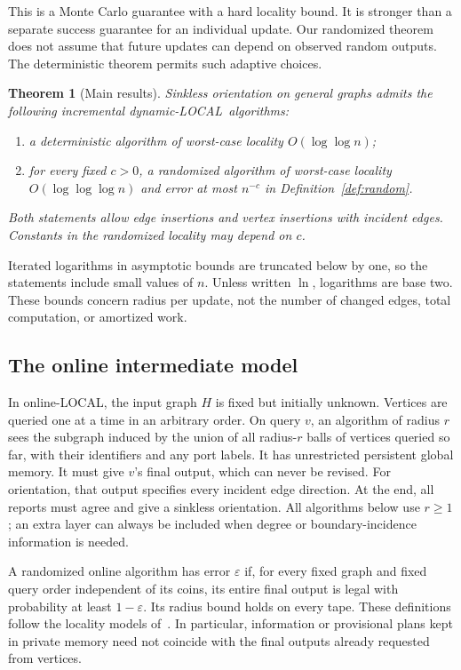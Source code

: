 \documentclass[11pt]{article}
\newtheorem{theorem}{Theorem}[section]
\theoremstyle{definition}
\newcommand{\Dyn}{\textnormal{dynamic-LOCAL}}
\newcommand{\On}{\textnormal{online-LOCAL}}
\begin{document}
This is a Monte Carlo guarantee with a hard locality bound. It is stronger
than a separate success guarantee for an individual update. Our randomized
theorem does not assume that future updates can depend on observed random
outputs. The deterministic theorem permits such adaptive choices.

\begin{theorem}[Main results]\label{thm:main}
Sinkless orientation on general graphs admits the following incremental
\Dyn\ algorithms:
\begin{enumerate}[label=(\roman*)]
\item a deterministic algorithm of worst-case locality $O(\log\log n)$;
\item for every fixed $c>0$, a randomized algorithm of worst-case locality
$O(\log\log\log n)$ and error at most $n^{-c}$ in
Definition~\ref{def:random}.
\end{enumerate}
Both statements allow edge insertions and vertex insertions with incident
edges. Constants in the randomized locality may depend on $c$.
\end{theorem}

Iterated logarithms in asymptotic bounds are truncated below by one, so the
statements include small values of $n$. Unless written $\ln$, logarithms are
base two. These bounds concern radius per update, not the number of changed
edges, total computation, or amortized work.

\subsection{The online intermediate model}

In \On, the input graph $H$ is fixed but initially unknown. Vertices are
queried one at a time in an arbitrary order. On query $v$, an algorithm of
radius $r$ sees the subgraph induced by the union of all radius-$r$ balls
of vertices queried so far, with their identifiers and any port labels. It
has unrestricted persistent global memory. It must give $v$'s final output,
which can never be revised. For orientation, that output specifies every
incident edge direction. At the end, all reports must agree and give a
sinkless orientation. All algorithms below use $r\ge1$; an extra layer can
always be included when degree or boundary-incidence information is needed.

A randomized online algorithm has error $\varepsilon$ if, for every fixed
graph and fixed query order independent of its coins, its entire final output
is legal with probability at least $1-\varepsilon$. Its radius bound holds
on every tape. These definitions follow the locality models
of~\cite{models,quantum}. In particular, information or provisional plans
kept in private memory need not coincide with the final outputs already
requested from vertices.
\end{document}
